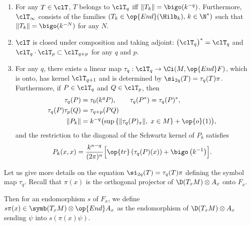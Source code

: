 \begin{theo}\label{theo:toeplitz}\leavevmode
\begin{enumerate}
\item\label{theo3.2.1} For any $T \in \clT $, $T$ belongs to $\clT_q $ iff $\| T_k \| = \bigo (k^{-q})$. Furthermore, $\clT_{\infty}$ consists of the families $(T_k \in \op{End} (\Hilb_k), \, k \in \N^*)$ such that $\| T_k \| = \bigo(k^{-N})$ for any $N$.
\item\label{theo3.2.2} $ \clT $ is closed under composition and taking adjoint: $ \bigl(\clT_q \bigr)^* = \clT_q$ and $\clT_q \cdot \clT_p \subset \clT_{q+p} $ for any $q$ and $p$.
\item\label{theo3.2.3} For any $q$, there exists a linear map $\tau_q : \clT_q \rightarrow
\Ci (M, \op{End} F) $, which is onto, has kernel $\clT_{q+1} $ and is determined by $\si_{2q} (T) = \tau_q(T)
\pi$. Furthermore, if $P \in \clT_q $ and $Q \in
\clT_p $, then
\begin{equation}
\begin{split}  \tau_q(P) &= \tau_0(k^{q}P), \qquad \tau_q(P ^*) =
\tau_q(P)^*, \\ 
\tau_q (P) \tau_p(Q) &= \tau_{q+p} (PQ) \\
 \| P_k \| &= k^{-q} \bigl(\sup \left\{ \| \tau_q (P)_x \|, \; x \in M \right\} + \op{o} (1) \bigr),
\end{split}
\end{equation}
and the restriction to the diagonal of the Schwartz kernel of $P_k$ satisfies
\begin{gather}\label{eq:trace_diag}
P_k (x,x) = \frac{k^{n-q}}{(2\pi)^n} \Bigl[\op{tr} \left(\tau_q (P) (x)\right) +
\bigo \left(k^{-1}\right) \Bigr].
\end{gather}
\end{enumerate}
\end{theo}

Let us give more details on the equation $\si_{2q} (T) = \tau_q(T)
\pi$ defining the symbol map $\tau_q$. Recall that $\pi(x)$ is the orthogonal projector of $\D (T_xM) \otimes A_x$ onto $F_x$.

Then for an endomorphism $s$ of $F_x$, we define $s
\pi(x) \in \symb (T_xM) \otimes \op{End} A_x $ as the endomorphism of $\D (T_xM) \otimes A_x$ sending $\psi $ into $s (\pi(x) \psi)$.


